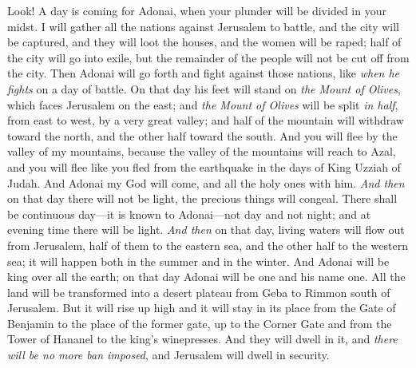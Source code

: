 \begin{biblechapter} %
 Look! A day is coming for Adonai, when your plunder will be divided in your midst.
\verse I will gather all the nations against Jerusalem to battle, and the city will be captured, and they will loot the houses, and the women will be raped; half of the city will go into exile, but the remainder of the people will not be cut off from the city.
\verse Then Adonai will go forth and fight against those nations, like \textit{when he fights} on a day of battle.
\verse On that day his feet will stand on \textit{the Mount of Olives}, which faces Jerusalem on the east; and \textit{the Mount of Olives} will be split \textit{in half}, from east to west, by a very great valley; and half of the mountain will withdraw toward the north, and the other half toward the south.
\verse And you will flee by the valley of my mountains, because the valley of the mountains will reach to Azal, and you will flee like you fled from the earthquake in the days of King Uzziah of Judah. And Adonai my God will come, and all the holy ones with him.
\verse \textit{And then} on that day there will not be light, the precious things will congeal.
\verse There shall be continuous day—it is known to Adonai—not day and not night; and at evening time there will be light.
\verse \textit{And then} on that day, living waters will flow out from Jerusalem, half of them to the eastern sea, and the other half to the western sea; it will happen both in the summer and in the winter.
\verse And Adonai will be king over all the earth; on that day Adonai will be one and his name one.
\verse All the land will be transformed into a desert plateau from Geba to Rimmon south of Jerusalem. But it will rise up high and it will stay in its place from the Gate of Benjamin to the place of the former gate, up to the Corner Gate and from the Tower of Hananel to the king’s winepresses.
\verse And they will dwell in it, and \textit{there will be no more ban imposed}, and Jerusalem will dwell in security.

\end{biblechapter}
